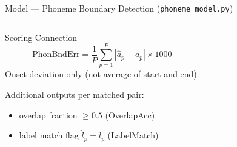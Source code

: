 \documentclass[aspectratio=169,9pt]{beamer}
\newcommand{\ah}{\hat{a}}
\begin{document}
\begin{frame}{Model --- Phoneme Boundary Detection (\texttt{phoneme\_model.py})}
\begin{columns}[T]
      \begin{block}{Scoring Connection}
        \[
          \mathrm{PhonBndErr}
            = \frac{1}{P}\sum_{p=1}^{P}|\ah_p - a_p|\times 1000
        \]
        \footnotesize Onset deviation only (not average of start and end).
        \medskip\par
        \small Additional outputs per matched pair:
        \begin{itemize}\setlength\itemsep{1pt}\footnotesize
          \item overlap fraction $\ge 0.5$ (OverlapAcc)
          \item label match flag $\hat{l}_p = l_p$ (LabelMatch)
        \end{itemize}
      \end{block}
  \end{columns}
\end{frame}

\end{document}
